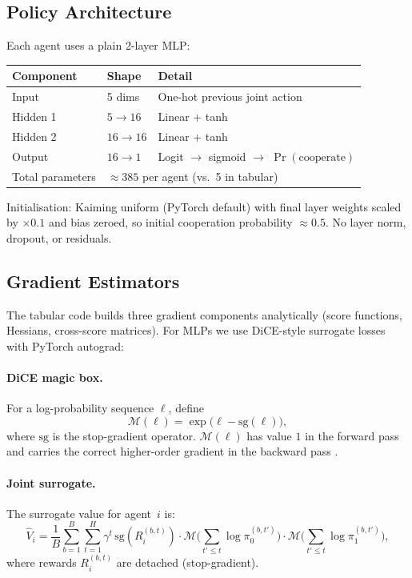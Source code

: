 \documentclass[11pt,a4paper]{article}
\begin{document}
\subsection{Policy Architecture}

Each agent uses a plain 2-layer MLP:
\begin{center}
\begin{tabular}{lll}
\toprule
Component & Shape & Detail \\
\midrule
Input & 5 dims & One-hot previous joint action \\
Hidden 1 & $5 \to 16$ & Linear + tanh \\
Hidden 2 & $16 \to 16$ & Linear + tanh \\
Output & $16 \to 1$ & Logit $\to$ sigmoid $\to$ $\Pr(\text{cooperate})$ \\
\midrule
Total parameters & \multicolumn{2}{l}{$\approx 385$ per agent (vs.\ 5 in tabular)} \\
\bottomrule
\end{tabular}
\end{center}

Initialisation: Kaiming uniform (PyTorch default) with final layer weights scaled by $\times 0.1$ and bias zeroed, so initial cooperation probability $\approx 0.5$. No layer norm, dropout, or residuals.

\subsection{Gradient Estimators}

The tabular code builds three gradient components analytically (score functions, Hessians, cross-score matrices). For MLPs we use DiCE-style surrogate losses with PyTorch autograd:

\paragraph{DiCE magic box.} For a log-probability sequence $\ell$, define
\[
  \mathcal{M}(\ell) = \exp\bigl(\ell - \mathrm{sg}(\ell)\bigr),
\]
where $\mathrm{sg}$ is the stop-gradient operator. $\mathcal{M}(\ell)$ has value $1$ in the forward pass and carries the correct higher-order gradient in the backward pass \cite{foerster2018dice}.

\paragraph{Joint surrogate.} The surrogate value for agent~$i$ is:
\[
  \hat{V}_i = \frac{1}{B}\sum_{b=1}^{B}\sum_{t=1}^{H}
    \gamma^t\, \mathrm{sg}\!\left(R_i^{(b,t)}\right)
    \cdot \mathcal{M}\!\Biggl(\sum_{t'\le t}\!\log\pi_0^{(b,t')}\Biggr)
    \cdot \mathcal{M}\!\Biggl(\sum_{t'\le t}\!\log\pi_1^{(b,t')}\Biggr),
\]
where rewards $R_i^{(b,t)}$ are detached (stop-gradient).
\end{document}

